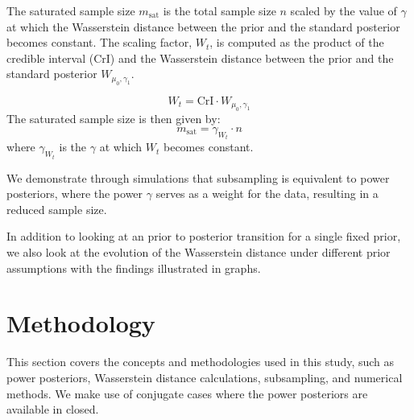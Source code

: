\documentclass[12pt]{article}
\begin{document}

The saturated sample size $m_{\text{sat}}$ is the total sample size $n$ scaled by the value of $\gamma$ at which the Wasserstein distance between the prior and the standard posterior becomes constant. The scaling factor, $W_t$, is computed as the product of the credible interval ($\text{CrI}$) and the Wasserstein distance between the prior and the standard posterior $W_{\mu_0, \gamma_1}$.

\[
W_t = \text{CrI} \cdot W_{\mu_0, \gamma_1}
\]
The saturated sample size is then given by:
\[
m_{\text{sat}} = \gamma_{W_t} \cdot n
\]
where $\gamma_{W_t}$ is the $\gamma$ at which $W_t$ becomes constant.


We demonstrate through simulations that subsampling is equivalent to power posteriors, where the power $\gamma$ serves as a weight for the data, resulting in a reduced sample size.

In addition to looking at an prior to posterior transition for a single fixed prior, we also look at the evolution of the Wasserstein distance under different prior assumptions with the findings illustrated in graphs. 

\section{Methodology}

This section covers the concepts and methodologies used in this study, such as power posteriors, Wasserstein distance calculations, subsampling, and numerical methods. We make use of conjugate cases where the power posteriors are available in closed. 
	
\end{document}
